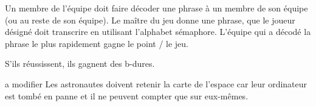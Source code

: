 \documentclass{grand-jeu}
\begin{document}
\begin{liste-materiel}
\end{liste-materiel}

\begin{regles}
Un membre de l’équipe doit faire décoder une phrase à un membre de son équipe (ou au reste de son équipe). Le maître du jeu donne une phrase, que le joueur désigné doit transcrire en utilisant l’alphabet sémaphore. L’équipe qui a décodé la phrase le plus rapidement gagne le point / le jeu. 
 
S’ils réussissent, ils gagnent des b-dures.
\end{regles}

\begin{imaginaire}
a modifier
Les astronautes doivent retenir la carte de l’espace car leur ordinateur est tombé en panne et il ne peuvent compter que sur eux-mêmes.
\end{imaginaire}

\begin{moments-stop}
\end{moments-stop}
\end{document}
